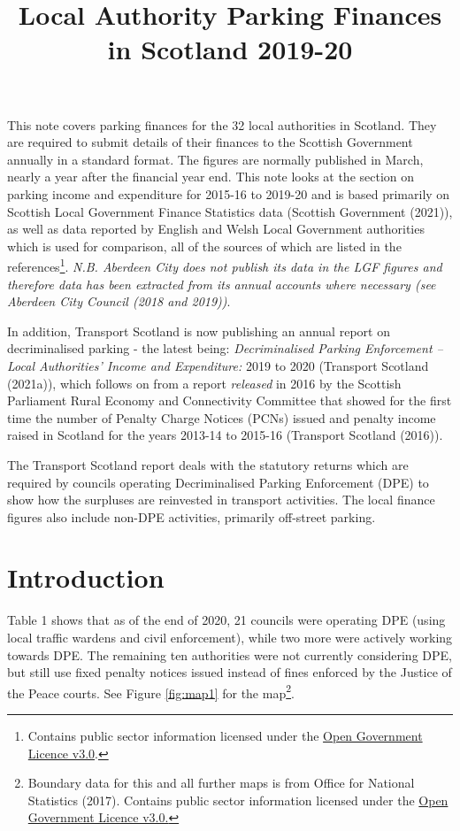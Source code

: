 \documentclass[
  12pt,
]{article}
\title{Local Authority Parking Finances in Scotland 2019-20}
\author{}
\date{\vspace{-2.5em}}
\begin{document}
\maketitle

\renewcommand{\arraystretch}{1.2}

This note covers parking finances for the 32 local authorities in Scotland. They are required to submit details of their finances to the Scottish Government annually in a standard format. The figures are normally published in March, nearly a year after the financial year end. This note looks at the section on parking income and expenditure for 2015-16 to 2019-20 and is based primarily on Scottish Local Government Finance Statistics data (Scottish Government (2021)), as well as data reported by English and Welsh Local Government authorities which is used for comparison, all of the sources of which are listed in the references\footnote{Contains public sector information licensed under the \href{http://www.nationalarchives.gov.uk/doc/open-government-licence/version/3/}{Open Government Licence v3.0}.}. \emph{N.B. Aberdeen City does not publish its data in the LGF figures and therefore data has been extracted from its annual accounts where necessary (see Aberdeen City Council (2018 and 2019))}.

In addition, Transport Scotland is now publishing an annual report on decriminalised parking - the latest being: \emph{Decriminalised Parking Enforcement -- Local Authorities' Income and Expenditure:} 2019 to 2020 (Transport Scotland (2021a)), which follows on from a report \emph{released} in 2016 by the Scottish Parliament Rural Economy and Connectivity Committee that showed for the first time the number of Penalty Charge Notices (PCNs) issued and penalty income raised in Scotland for the years 2013-14 to 2015-16 (Transport Scotland (2016)).

The Transport Scotland report deals with the statutory returns which are required by councils operating Decriminalised Parking Enforcement (DPE) to show how the surpluses are reinvested in transport activities. The local finance figures also include non-DPE activities, primarily off-street parking.

\hypertarget{introduction}{%
\section{Introduction}\label{introduction}}

Table 1 shows that as of the end of 2020, 21 councils were operating DPE (using local traffic wardens and civil enforcement), while two more were actively working towards DPE. The remaining ten authorities were not currently considering DPE, but still use fixed penalty notices issued instead of fines enforced by the Justice of the Peace courts. See Figure \ref{fig:map1} for the map\footnote{Boundary data for this and all further maps is from Office for National Statistics (2017). Contains public sector information licensed under the \href{http://www.nationalarchives.gov.uk/doc/open-government-licence/version/3/}{Open Government Licence v3.0.}}.
\end{document}

